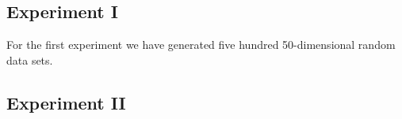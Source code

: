 
\subsection*{Experiment I}
For the first experiment we have generated five hundred 50-dimensional random data sets. 

\subsection*{Experiment II}

